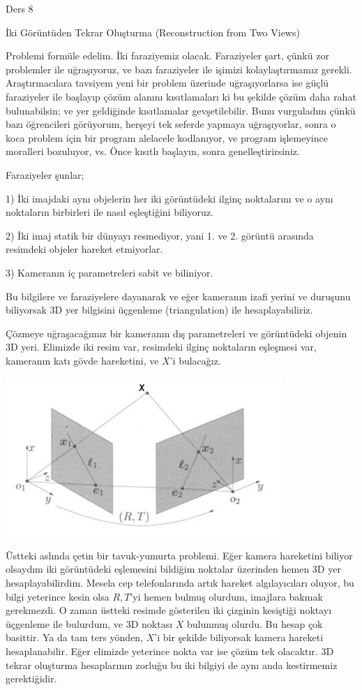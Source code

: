 \documentclass[12pt,fleqn]{article}\usepackage{../../common}
\begin{document}
Ders 8

İki Görüntüden Tekrar Oluşturma (Reconstruction from Two Views)

Problemi formüle edelim. İki faraziyemiz olacak. Faraziyeler şart, çünkü zor
problemler ile uğraşıyoruz, ve bazı faraziyeler ile işimizi kolaylaştırmamız
gerekli. Araştırmacılara tavsiyem yeni bir problem üzerinde uğraşıyorlarsa ise
güçlü faraziyeler ile başlayıp çözüm alanını kısıtlamaları ki bu şekilde çözüm
daha rahat bulunabilsin; ve yer geldiğinde kısıtlamalar gevşetilebilir. Bunu
vurguladım çünkü bazı öğrencileri görüyorum, herşeyi tek seferde yapmaya
uğraşıyorlar, sonra o koca problem için bir program alelacele kodlanıyor, ve
program işlemeyince moralleri bozuluyor, vs. Önce kısıtlı başlayın, sonra
genelleştirirsiniz.

Faraziyeler şunlar;

1) İki imajdaki aynı objelerin her iki görüntüdeki ilginç noktalarını ve o aynı
noktaların birbirleri ile nasıl eşleştiğini biliyoruz.

2) İki imaj statik bir dünyayı resmediyor, yani 1. ve 2. görüntü arasında
resimdeki objeler hareket etmiyorlar.

3) Kameranın iç parametreleri sabit ve biliniyor.

Bu bilgilere ve faraziyelere dayanarak ve eğer kameranın izafi yerini ve
duruşunu biliyorsak 3D yer bilgisini üçgenleme (triangulation) ile
hesaplayabiliriz.

Çözmeye uğraşacağımız bir kameranın dış parametreleri ve görüntüdeki objenin 3D
yeri. Elimizde iki resim var, resimdeki ilginç noktaların eşleşmesi var,
kameranın katı gövde hareketini, ve $X$'i bulacağız.

\includegraphics[height=6cm]{twoview.png}

Üstteki aslında çetin bir tavuk-yumurta problemi. Eğer kamera hareketini
biliyor olsaydım iki görüntüdeki eşlemesini bildiğim noktalar üzerinden
hemen 3D yer hesaplayabilirdim. Mesela cep telefonlarında artık hareket
algılayıcıları oluyor, bu bilgi yeterince kesin olsa $R,T$'yi hemen bulmuş
olurdum, imajlara bakmak gerekmezdi. O zaman üstteki resimde gösterilen iki
çizginin kesiştiği noktayı üçgenleme ile bulurdum, ve 3D noktası $X$
bulunmuş olurdu. Bu hesap çok basittir. Ya da tam ters yönden, $X$'i bir
şekilde biliyorsak kamera hareketi hesaplanabilir. Eğer elimizde yeterince
nokta var ise çözüm tek olacaktır. 3D tekrar oluşturma hesaplarının zorluğu
bu iki bilgiyi de aynı anda kestirmemiz gerektiğidir.
\end{document}
